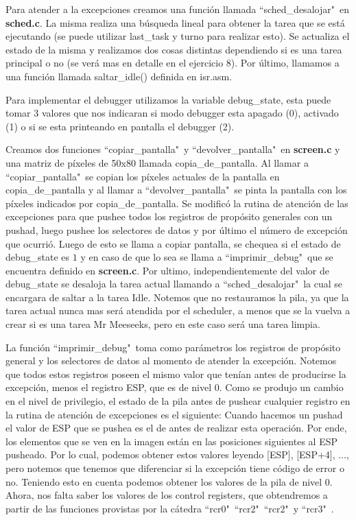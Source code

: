 \documentclass[a4paper]{article}
\begin{document}
\justify
Para atender a la excepciones creamos una función llamada ``sched_desalojar"\ en \textbf{sched.c}. La misma realiza una búsqueda lineal para obtener la tarea que se está ejecutando (se puede utilizar last_task y turno para realizar esto). Se actualiza el estado de la misma y realizamos dos cosas distintas dependiendo si es una tarea principal o no (se verá mas en detalle en el ejercicio $8$). Por último, llamamos a una función llamada saltar_idle() definida en isr.asm.


\justify
Para implementar el debugger utilizamos la variable debug_state, esta puede tomar $3$ valores que nos indicaran si modo debugger esta apagado (0), activado (1) o si se esta printeando en pantalla el debugger (2).

\justify
Creamos dos funciones ``copiar_pantalla"\ y ``devolver_pantalla"\ en \textbf{screen.c} y una matriz de píxeles de 50x80 llamada copia_de_pantalla. Al llamar a ``copiar_pantalla"\ se copian los píxeles actuales de la pantalla en copia_de_pantalla y al llamar a ``devolver_pantalla"\ se pinta la pantalla con los píxeles indicados por copia_de_pantalla.
\justify
Se modificó la rutina de atención de las excepciones para que pushee todos los registros de propósito generales con un pushad, luego pushee los selectores de datos y por último el número de excepción que ocurrió. Luego de esto se llama a copiar pantalla, se chequea si el estado de debug_state es $1$ y en caso de que lo sea se llama a ``imprimir_debug"\ que se encuentra definido en \textbf{screen.c}. Por ultimo, independientemente del valor de debug_state se desaloja la tarea actual llamando a ``sched_desalojar"\, la cual se encargara de saltar a la tarea Idle. Notemos que no restauramos la pila, ya que la tarea actual nunca mas será atendida por el scheduler, a menos que se la vuelva a crear si es una tarea Mr Meeseeks, pero en este caso será una tarea limpia.

\justify
La función ``imprimir_debug"\ toma como parámetros los registros de propósito general y los selectores de datos al momento de atender la excepción. Notemos que todos estos registros poseen el mismo valor que tenían antes de producirse la excepción, menos el registro ESP, que es de nivel 0. Como se produjo un cambio en el nivel de privilegio, el estado de la pila antes de pushear cualquier registro en la rutina de atención de excepciones es el siguiente:
Cuando hacemos un pushad el valor de ESP que se pushea es el de antes de realizar esta operación. Por ende, los elementos que se ven en la imagen están en las posiciones siguientes al ESP pusheado. Por lo cual, podemos obtener estos valores leyendo [ESP], [ESP+4], $\dots$, pero notemos que tenemos que diferenciar si la excepción tiene código de error o no. Teniendo esto en cuenta podemos obtener los valores de la pila de nivel 0. Ahora, nos falta saber los valores de los control registers, que obtendremos a partir de las funciones provistas por la cátedra ``rcr0"\, ``rcr2"\, ``rcr2"\ y ``rcr3"\ .
\end{document}
